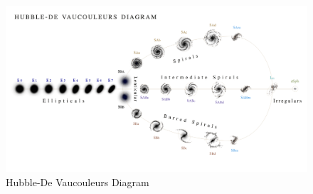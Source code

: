 \documentclass[12pt, oneside]{smuthesis}
\begin{document}
\begin{figure}[H]
	\centering
	\includegraphics[width=\linewidth]{GalaxyClassificationChart}
	\caption{Hubble-De Vaucouleurs Diagram \citep{devaucouleurs}}
	\label{fig:classDiagram}
\end{figure}
\end{document}
